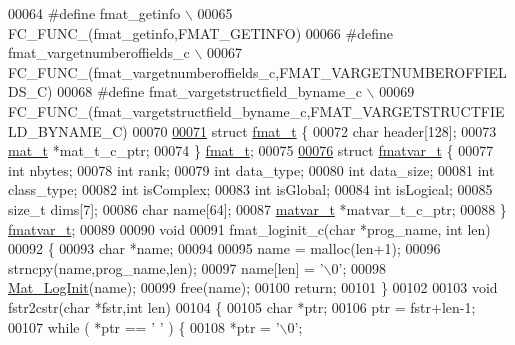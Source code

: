 \begin{DoxyCode}
00064 \textcolor{preprocessor}{#define fmat\_getinfo \(\backslash\)}
00065 \textcolor{preprocessor}{            FC\_FUNC\_(fmat\_getinfo,FMAT\_GETINFO)}
00066 \textcolor{preprocessor}{#define fmat\_vargetnumberoffields\_c \(\backslash\)}
00067 \textcolor{preprocessor}{            FC\_FUNC\_(fmat\_vargetnumberoffields\_c,FMAT\_VARGETNUMBEROFFIELDS\_C)}
00068 \textcolor{preprocessor}{#define fmat\_vargetstructfield\_byname\_c \(\backslash\)}
00069 \textcolor{preprocessor}{            FC\_FUNC\_(fmat\_vargetstructfield\_byname\_c,FMAT\_VARGETSTRUCTFIELD\_BYNAME\_C)}
00070 
\hyperlink{structfmat__t}{00071} \textcolor{keyword}{struct }\hyperlink{structfmat__t}{fmat\_t} \{
00072     \textcolor{keywordtype}{char}   header[128];
00073     \hyperlink{struct__mat__t}{mat\_t} *mat\_t\_c\_ptr;
00074 \} \hyperlink{structfmat__t}{fmat\_t};
00075 
\hyperlink{structfmatvar__t}{00076} \textcolor{keyword}{struct }\hyperlink{structfmatvar__t}{fmatvar\_t} \{
00077     \textcolor{keywordtype}{int}       nbytes;
00078     \textcolor{keywordtype}{int}       rank;
00079     \textcolor{keywordtype}{int}       data\_type;
00080     \textcolor{keywordtype}{int}       data\_size;
00081     \textcolor{keywordtype}{int}       class\_type;
00082     \textcolor{keywordtype}{int}       isComplex;
00083     \textcolor{keywordtype}{int}       isGlobal;
00084     \textcolor{keywordtype}{int}       isLogical;
00085     \textcolor{keywordtype}{size\_t}    dims[7];
00086     \textcolor{keywordtype}{char}      name[64];
00087     \hyperlink{group___m_a_t_structmatvar__t}{matvar\_t} *matvar\_t\_c\_ptr;
00088 \} \hyperlink{structfmatvar__t}{fmatvar\_t};
00089 
00090 \textcolor{keywordtype}{void}
00091 fmat\_loginit\_c(\textcolor{keywordtype}{char} *prog\_name, \textcolor{keywordtype}{int} len)
00092 \{
00093     \textcolor{keywordtype}{char} *name;
00094 
00095     name = malloc(len+1);
00096     strncpy(name,prog\_name,len);
00097     name[len] = \textcolor{charliteral}{'\(\backslash\)0'};
00098     \hyperlink{group__mat__util_ga0d30e03216ceaab7c0a4ff878b26f89f}{Mat\_LogInit}(name);
00099     free(name);
00100     \textcolor{keywordflow}{return};
00101 \}
00102 
00103 \textcolor{keywordtype}{void} fstr2cstr(\textcolor{keywordtype}{char} *fstr,\textcolor{keywordtype}{int} len)
00104 \{
00105     \textcolor{keywordtype}{char} *ptr;
00106     ptr = fstr+len-1;
00107     \textcolor{keywordflow}{while} ( *ptr == \textcolor{charliteral}{' '} ) \{
00108         *ptr = \textcolor{charliteral}{'\(\backslash\)0'};

\end{DoxyCode}
